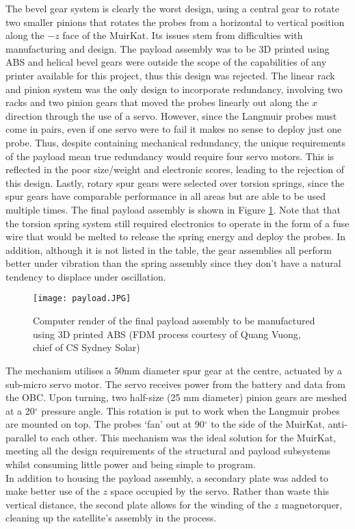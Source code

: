 The bevel gear system is clearly the worst design, using a central gear to rotate two smaller pinions that rotates the probes from a horizontal to vertical position along the $-z$ face of the MuirKat. Its issues stem from difficulties with manufacturing and design. The payload assembly was to be 3D printed using ABS and helical bevel gears were outside the scope of the capabilities of any printer available for this project, thus this design was rejected. The linear rack and pinion system was the only design to incorporate redundancy, involving two racks and two pinion gears that moved the probes linearly out along the $x$ direction through the use of a servo. However, since the Langmuir probes must come in pairs, even if one servo were to fail it makes no sense to deploy just one probe. Thus, despite containing mechanical redundancy, the unique requirements of the payload mean true redundancy would require four servo motors. This is reflected in the poor size/weight and electronic scores, leading to the rejection of this design. Lastly, rotary spur gears were selected over torsion springs, since the spur gears have comparable performance in all areas but are able to be used multiple times. The final payload assembly is shown in Figure \ref{fig:payload}. Note that that the torsion spring system still required electronics to operate in the form of a fuse wire that would be melted to release the spring energy and deploy the probes. In addition, although it is not listed in the table, the gear assemblies all perform better under vibration than the spring assembly since they don't have a natural tendency to displace under oscillation.\\

\begin{figure}[!h]
\centering 
\texttt{[image: payload.JPG]}
\caption{Computer render of the final payload assembly to be manufactured using 3D printed ABS (FDM process courtesy of Quang Vuong, chief of CS Sydney Solar)}
\label{fig:payload}
\end{figure}

The mechanism utilises a 50mm diameter spur gear at the centre, actuated by a sub-micro servo motor. The servo receives power from the battery and data from the OBC. Upon turning, two half-size (25 mm diameter) pinion gears are meshed at a 20$^{\circ}$ pressure angle. This rotation is put to work when the Langmuir probes are mounted on top. The probes `fan' out at 90$^{\circ}$ to the side of the MuirKat, anti-parallel to each other. This mechanism was the ideal solution for the MuirKat, meeting all the design requirements of the structural and payload subsystems whilst consuming little power and being simple to program.\\ 

In addition to housing the payload assembly, a secondary plate was added to make better use of the $z$ space occupied by the servo. Rather than waste this vertical distance, the second plate allows for the winding of the $z$ magnetorquer, cleaning up the satellite's assembly in the process.
